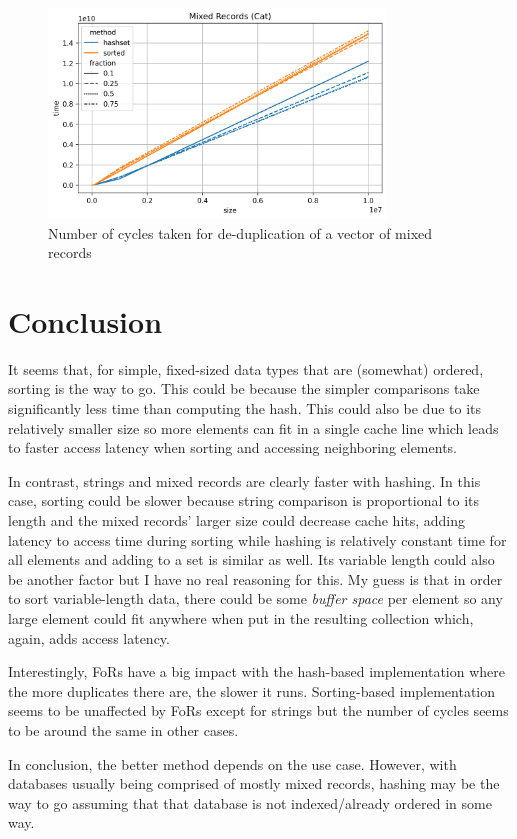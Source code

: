 \begin{figure}[h]
	\centering
	\includegraphics[width=0.8\textwidth]{graphics/03-cat.png}
	\caption{Number of cycles taken for de-duplication of a vector of mixed records}
\end{figure}

\section{Conclusion}

It seems that, for simple, fixed-sized data types that are (somewhat) ordered, sorting is the way to go. This could be because the simpler comparisons take significantly less time than computing the hash. This could also be due to its relatively smaller size so more elements can fit in a single cache line which leads to faster access latency when sorting and accessing neighboring elements.

In contrast, strings and mixed records are clearly faster with hashing. In this case, sorting could be slower because string comparison is proportional to its length and the mixed records' larger size could decrease cache hits, adding latency to access time during sorting while hashing is relatively constant time for all elements and adding to a set is similar as well.
Its variable length could also be another factor but I have no real reasoning for this. My guess is that in order to sort variable-length data, there could be some \textit{buffer space} per element so any large element could fit anywhere when put in the resulting collection which, again, adds access latency.

Interestingly, FoRs have a big impact with the hash-based implementation where the more duplicates there are, the slower it runs. Sorting-based implementation seems to be unaffected by FoRs except for strings but the number of cycles seems to be around the same in other cases.

In conclusion, the better method depends on the use case. However, with databases usually being comprised of mostly mixed records, hashing may be the way to go assuming that that database is not indexed/already ordered in some way.
